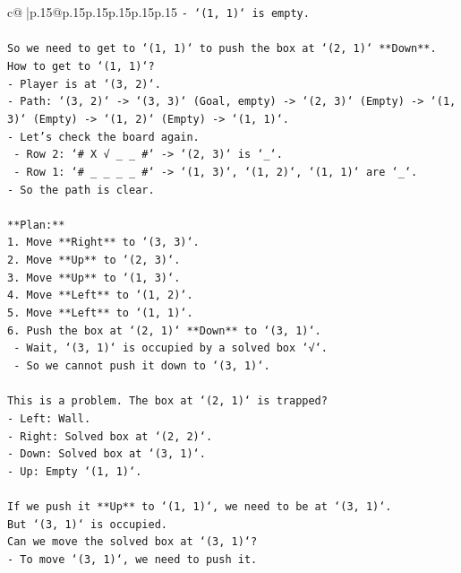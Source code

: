 \documentclass{article}
\begin{document}
{\begin{supertabular}{c@{$\;$}|p{.15\linewidth}@{}p{.15\linewidth}p{.15\linewidth}p{.15\linewidth}p{.15\linewidth}p{.15\linewidth}}
{{{\texttt{{-} `(1, 1)` is empty.} \\
\\ 
\texttt{So we need to get to `(1, 1)` to push the box at `(2, 1)` **Down**.} \\
\texttt{How to get to `(1, 1)`?} \\
\texttt{{-} Player is at `(3, 2)`.} \\
\texttt{{-} Path: `(3, 2)` {-}> `(3, 3)` (Goal, empty) {-}> `(2, 3)` (Empty) {-}> `(1, 3)` (Empty) {-}> `(1, 2)` (Empty) {-}> `(1, 1)`.} \\
\texttt{{-} Let's check the board again.} \\
\texttt{  {-} Row 2: `\# X √ \_ \_ \#` {-}> `(2, 3)` is `\_`.} \\
\texttt{  {-} Row 1: `\# \_ \_ \_ \_ \#` {-}> `(1, 3)`, `(1, 2)`, `(1, 1)` are `\_`.} \\
\texttt{{-} So the path is clear.} \\
\\ 
\texttt{**Plan:**} \\
\texttt{1. Move **Right** to `(3, 3)`.} \\
\texttt{2. Move **Up** to `(2, 3)`.} \\
\texttt{3. Move **Up** to `(1, 3)`.} \\
\texttt{4. Move **Left** to `(1, 2)`.} \\
\texttt{5. Move **Left** to `(1, 1)`.} \\
\texttt{6. Push the box at `(2, 1)` **Down** to `(3, 1)`.} \\
\texttt{   {-} Wait, `(3, 1)` is occupied by a solved box `√`.} \\
\texttt{   {-} So we cannot push it down to `(3, 1)`.} \\
\\ 
\texttt{This is a problem. The box at `(2, 1)` is trapped?} \\
\texttt{{-} Left: Wall.} \\
\texttt{{-} Right: Solved box at `(2, 2)`.} \\
\texttt{{-} Down: Solved box at `(3, 1)`.} \\
\texttt{{-} Up: Empty `(1, 1)`.} \\
\\ 
\texttt{If we push it **Up** to `(1, 1)`, we need to be at `(3, 1)`.} \\
\texttt{But `(3, 1)` is occupied.} \\
\texttt{Can we move the solved box at `(3, 1)`?} \\
\texttt{{-} To move `(3, 1)`, we need to push it.} \\
}}}
\end{supertabular}}
\end{document}
